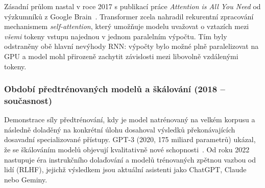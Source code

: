 Zásadní průlom nastal v roce 2017 s publikací práce \textit{Attention is All You Need} od výzkumníků z Google Brain~\cite{vaswani-attention}.
Transformer zcela nahradil rekurentní zpracování mechanismem \textit{self-attention}, který umožňuje modelu uvažovat o vztazích mezi \textit{všemi} tokeny vstupu najednou v jednom paralelním výpočtu.
Tím byly odstraněny obě hlavní nevýhody RNN: výpočty bylo možné plně paralelizovat na GPU a model mohl přirozeně zachytit závislosti mezi libovolně vzdálenými tokeny.

\subsubsection*{Období předtrénovaných modelů a škálování (2018 -- současnost)}
\label{subsubsec:llm-history-pretraining}

Demonstrace síly předtrénování, kdy je model natrénovaný na velkém korpusu a následně doladěný na konkrétní úlohu dosahoval výsledků překonávajících dosavadní specializované přístupy.
GPT-3 (2020, 175 miliard parametrů) ukázal, že se škálováním modelů objevují kvalitativně nové schopnosti~\cite{brown-gpt3}.
Od roku 2022 nastupuje éra instrukčního dolaďování a modelů trénovaných zpětnou vazbou od lidí (RLHF), jejichž výsledkem jsou aktuální asistenti jako ChatGPT, Claude nebo Geminy.

\begin{table}[H]
    \centering
    \caption{Přehled klíčových etap vývoje jazykových modelů}
    \label{tab:llm-history-summary}
\end{table}

